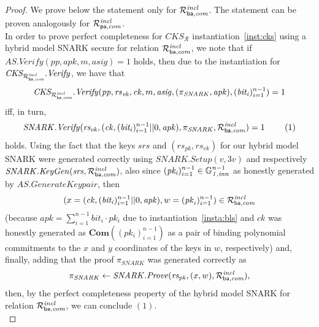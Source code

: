 \begin{proof} We prove below the statement only for $\mathcal{R}^{\mathit{incl}}_{\mathsf{ba},\mathit{com}}$. The statement can be proven analogously for $\mathcal{R}^{\mathit{incl}}_{\mathsf{pa},\mathit{com}}$. \\

In order to prove perfect completeness for $\mathit{CKS}_{\mathcal{R}}$ instantiation~\ref{inst:cks} using a hybrid model SNARK secure for relation 
$\mathcal{R}^{\mathit{incl}}_{\mathsf{ba},\mathit{com}}$, we note that if $\mathit{AS.Verify}(\mathit{pp}, \mathit{apk}, m, \mathit{asig}) = 1$ holds, then due to the instantiation for 
$\mathit{CKS_{\mathcal{R}^{\mathit{incl}}_{\mathsf{ba},\mathit{com}}}.Verify}$, we have that 
$$\mathit{CKS_{\mathcal{R}^{\mathit{incl}}_{\mathsf{ba},\mathit{com}}}.Verify}(\mathit{pp}, \mathit{rs}_{\mathit{vk}}, \mathit{ck}, m, \mathit{asig}, (\pi_{\mathit{SNARK}}, \mathit{apk}), (\mathit{bit_i})_{i=1}^{n-1}) =1$$ 
iff, in turn, 
$$\mathit{SNARK.Verify}(\mathit{rs_{vk}}, (\mathit{ck}, (\mathit{bit_i})_{i=1}^{n-1} || 0, \mathit{apk}), \pi_{\mathit{SNARK}}, \mathcal{R}^{\mathit{incl}}_{\mathsf{ba},\mathit{com}}) = 1 \ \ \ \ \ \ \ (1)$$ holds. 
Using the fact that the keys $\mathit{srs}$ and $(\mathit{rs}_{\mathit{pk}}, \mathit{rs}_{\mathit{vk}})$ for our hybrid model SNARK were generated correctly using 
$\mathit{SNARK.Setup}(v, 3v)$ and respectively $\mathit{SNARK.KeyGen}(\mathit{srs}, \mathcal{R}^{\mathit{incl}}_{\mathsf{ba},\mathit{com}})$, 
 also since $(\mathit{pk_i})_{i=1}^{n-1} \in \mathbb{G}_{\mathit{1,inn}}^{n-1}$ as honestly generated by $\mathit{AS.GenerateKeypair}$, then 
$$(x = (\mathit{ck}, (\mathit{bit_i})_{i=1}^{n-1}||0, \mathit{apk}), w = (\mathit{pk}_i)_{i=1}^{n-1}) \in \mathcal{R}^{\mathit{incl}}_{\mathsf{ba},\mathit{com}}$$ 
(because $\mathit{apk} = \sum_{i=1}^{n-1} \mathit{bit_i} \cdot \mathit{pk_i}$ due to instantiation~\ref{insta:bls} and 
$\mathit{ck}$ was honestly generated as  $\mathbf{Com}((\mathit{pk_i})_{i=1}^{n-1})$ as a pair of binding polynomial commitments to the $x$ and $y$ 
coordinates of the keys in $w$, respectively) and, finally, adding that the proof 
$\pi_{\mathit{SNARK}}$ was generated correctly as 
$$ \pi_{\mathit{SNARK}} \leftarrow \mathit{SNARK.Prove}(\mathit{rs_{pk}}, (x,w), \mathcal{R}^{\mathit{incl}}_{\mathsf{ba},\mathit{com}}),$$ 
then, by the perfect completeness property of the hybrid model SNARK for relation $\mathcal{R}^{\mathit{incl}}_{\mathsf{ba},\mathit{com}}$, we can conclude $(1)$.\\


\end{proof}
